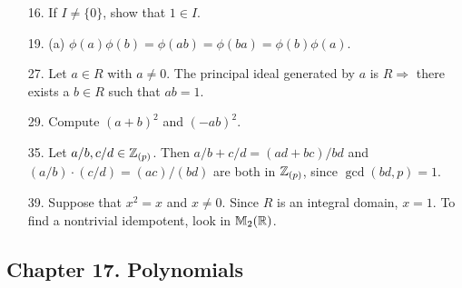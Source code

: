 {\begin{itemize}
 
\item[16.]
If $I \neq \{ 0 \}$, show that $1 \in I$.
 
\item[19.]
(a) $\phi(a) \phi(b) = \phi(ab) = \phi(ba) = \phi(b) \phi(a)$.
 
\item[27.] 
Let $a \in R$ with $a \neq 0$. The principal ideal generated by $a$ is $R
\Rightarrow$ there exists a $b \in R$ such that $ab =1$.
 
 
\item[29.]
Compute $(a+b)^2$ and $(-ab)^2$.
 
 
\item[35.]
Let $a/b, c/d \in {\Bbb Z}_{(p)}$. Then \mbox{$a/b + c/d = (ad +
bc)/bd$} and $(a/b) \cdot (c/d) = (ac)/(bd)$ are both in ${\Bbb
Z}_{(p)}$, since $\gcd(bd,p)=1$.  

 
\item[39.]
Suppose that $x^2 = x$ and $x \neq 0$. Since $R$ is an integral
domain, $x = 1$. To find a nontrivial idempotent, look in ${\Bbb
M}_2({\Bbb R})$.
 
 
 
\end{itemize}
}
 
\subsection*{Chapter 17. Polynomials}
 
